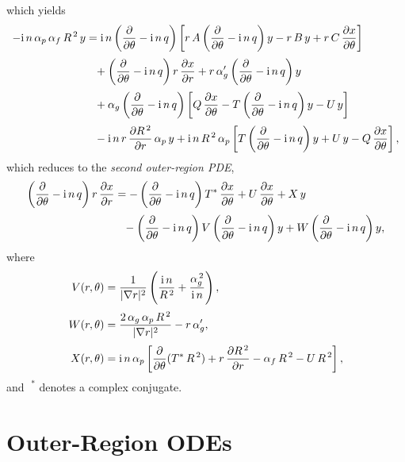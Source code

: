 \documentclass[12pt,prb,aps]{revtex4-1}
\begin{document}
which yields
\begin{align}
-{\rm i}\,n\,\alpha_p\,\alpha_f\,R^{\,2}\,y&={\rm i}\,n\left(\frac{\partial}{\partial\theta}-{\rm i}\,n\,q\right)\left[r\,A\left(\frac{\partial}{\partial \theta}-{\rm i}\,n\,q\right)y-r\,B\,y+r\,C\,\frac{\partial x}{\partial\theta}\right]\nonumber\\[0.5ex]&\phantom= +\left(\frac{\partial}{\partial\theta}-{\rm i}\,n\,q\right)r\,\frac{\partial x}{\partial r}  +r\,\alpha_g'\left(\frac{\partial}{\partial\theta}-{\rm i}\,n\,q\right)y \nonumber\\[0.5ex]
&\phantom{=}+ \alpha_g\left(\frac{\partial}{\partial\theta}-{\rm i}\,n\,q\right)\left[Q\,\frac{\partial x}{\partial\theta}
-T\left(\frac{\partial}{\partial\theta}-{\rm i}\,n\,q\right)y-U\,y\right]\nonumber\\[0.5ex]&\phantom{=}
-{\rm i}\,n\,r\,\frac{\partial R^{\,2}}{\partial r}\,\alpha_p\,y+{\rm i}\,n\,R^{\,2}\,\alpha_p \left[T\left(\frac{\partial}{\partial\theta}-{\rm i}\,n\,q\right)y + U\,y -Q\,\frac{\partial x}{\partial\theta}\right],
\end{align}
which reduces to the {\em second outer-region PDE},\cite{connor}
\begin{align}\label{esecond}
\left(\frac{\partial}{\partial\theta}-{\rm i}\,n\,q\right)r\,\frac{\partial x}{\partial r} &= -\left(\frac{\partial}{\partial\theta}-{\rm i}\,n\,q\right)T^\ast\,\frac{\partial x}{\partial \theta} + U\,\frac{\partial x}{\partial\theta}+X\,y\nonumber\\[0.5ex]&\phantom{=} -\left(\frac{\partial}{\partial\theta}-{\rm i}\,n\,q\right)V\left(\frac{\partial}{\partial\theta}-{\rm i}\,n\,q\right)y + W\left(\frac{\partial}{\partial\theta}-{\rm i}\,n\,q\right)y,
\end{align}
where
\begin{align}
V(r,\theta)&= \frac{1}{|\nabla r|^2}\left(\frac{{\rm i}\,n}{R^{\,2}}+\frac{\alpha_g^{\,2}}{{\rm i}\,n}\right),\label{ev}\\[0.5ex]
W(r,\theta)&= \frac{2\,\alpha_g\,\alpha_p\,R^{\,2}}{|\nabla r|^2} -r\,\alpha_g',\label{ew}\\[0.5ex]
X(r,\theta)&= {\rm i}\,n\,\alpha_p\left[\frac{\partial}{\partial \theta}(T^\ast\,R^{\,2})+r\,\frac{\partial R^{\,2}}{\partial r}-\alpha_f\,R^{\,2}-U\,R^{\,2}\right],\label{ex}
\end{align}
and $\phantom{!}^\ast$ denotes a complex conjugate. 

\section{Outer-Region ODEs}\label{sode}
\end{document}
